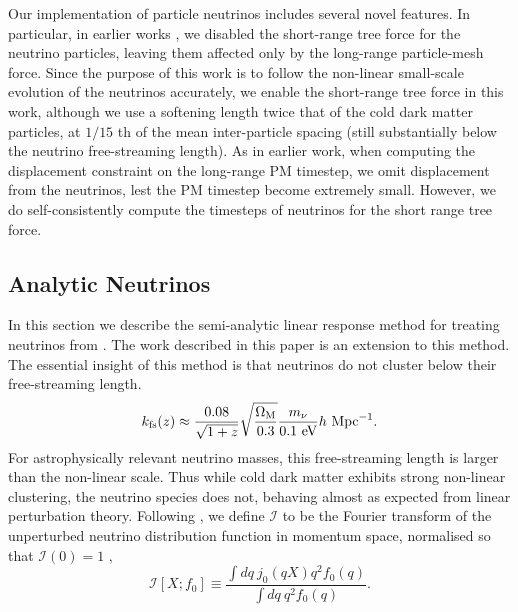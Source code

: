 \documentclass[useAMS, usenatbib]{mnras}
\begin{document}
Our implementation of particle neutrinos includes several novel features. In particular, in earlier works \citep{Bird_2012}, we disabled the short-range tree force for the neutrino particles, leaving them affected only by the long-range particle-mesh force. Since the purpose of this work is to follow the non-linear small-scale evolution of the neutrinos accurately, we enable the short-range tree force in this work, although we use a softening length
twice that of the cold dark matter particles, at $1/15$ th of the mean inter-particle spacing (still substantially below the neutrino free-streaming length). As in earlier work, when computing the displacement constraint on the long-range PM timestep, we omit displacement from the neutrinos, lest the PM timestep become extremely small. However, we do self-consistently compute the timesteps of neutrinos for the short range tree force.

\subsection{Analytic Neutrinos}
\label{sec:analytic}

In this section we describe the semi-analytic linear response method for treating neutrinos from \cite{AHB}.
The work described in this paper is an extension to this method. The essential insight of this method is that
neutrinos do not cluster below their free-streaming length.
\begin{equation}
 k_{\rm fs}(z) \approx \frac{0.08}{\sqrt{1+z}}
\sqrt{\frac{\Omega_{\rm M}}{0.3}} \frac{m_{\nu}}{0.1 ~ \textrm{eV}} h~ \textrm{Mpc}^{-1}.  \label{eq:kfs}
\end{equation}
For astrophysically relevant neutrino masses, this free-streaming length is larger than the non-linear scale.
Thus while cold dark matter exhibits strong non-linear clustering, the neutrino species does not, behaving
almost as expected from linear perturbation theory. Following \cite{AHB}, we define $\mathcal{I}$ to
be the Fourier transform of the unperturbed neutrino distribution function in momentum space, normalised so
that $\mathcal{I}(0) = 1$ \citep{Brandenberger_1987, Bertschinger_Watts_1988},
\begin{equation}
\mathcal{I}[X; f_0] \equiv \frac{\int dq~ j_0(q X) q^2 f_0(q) }{\int dq ~q^2 f_0(q)}. \label{eq:I.def}
\end{equation}
\end{document}
